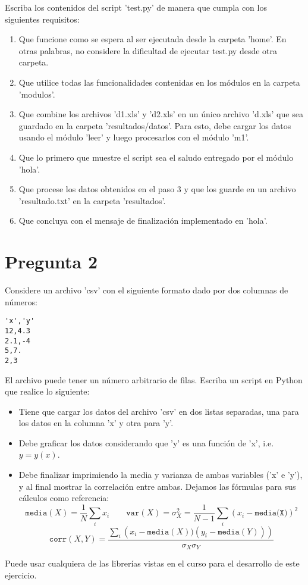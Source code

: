 \documentclass{article}
\begin{document}
    Escriba los contenidos del script 'test.py' de manera que cumpla con los siguientes requisitos: 
    \begin{enumerate}
        \item Que funcione como se espera al ser ejecutada desde la carpeta 'home'. En otras palabras, no considere la dificultad de ejecutar test.py desde otra carpeta.
        \item Que utilice todas las funcionalidades contenidas en los módulos en la carpeta 'modulos'.
        \item Que combine los archivos 'd1.xls' y 'd2.xls' en un único archivo 'd.xls' que sea guardado en la carpeta 'resultados/datos'. Para esto, debe cargar los datos usando el módulo 'leer' y luego procesarlos con el módulo 'm1'.
        \item Que lo primero que muestre el script sea el saludo entregado por el módulo 'hola'.
        \item Que procese los datos obtenidos en el paso 3 y que los guarde en un archivo 'resultado.txt' en la carpeta 'resultados'.
        \item Que concluya con el mensaje de finalización implementado en 'hola'.
    \end{enumerate}
\section*{Pregunta 2}
Considere un archivo 'csv' con el siguiente formato dado por dos columnas de números:
    \begin{verbatim}
'x','y'
12,4.3
2.1,-4
5,7.
2,3
    \end{verbatim}
El archivo puede tener un número arbitrario de filas. Escriba un script en Python que realice lo siguiente:
    \begin{itemize}
        \item Tiene que cargar los datos del archivo 'csv' en dos listas separadas, una para los datos en la columna 'x' y otra para 'y'.
        \item Debe graficar los datos considerando que 'y' es una función de 'x', i.e. $y=y(x)$.
        \item Debe finalizar imprimiendo la media y varianza de ambas variables ('x' e 'y'), y al final mostrar la correlación entre ambas. Dejamos las fórmulas para sus cálculos como referencia: 
            $$ \texttt{media}(X) = \frac 1 N \sum_i x_i \qquad \texttt{var}(X) = \sigma_X^2 = \frac{1}{N-1}\sum_i(x_i-\texttt{media(X)})^2$$
            $$\texttt{corr}(X,Y) = \frac{\sum_i\left(x_i - \texttt{media}(X))(y_i - \texttt{media}(Y))\right)}{\sigma_X\sigma_Y} $$
    \end{itemize}
Puede usar cualquiera de las librerías vistas en el curso para el desarrollo de este ejercicio.
\end{document}
